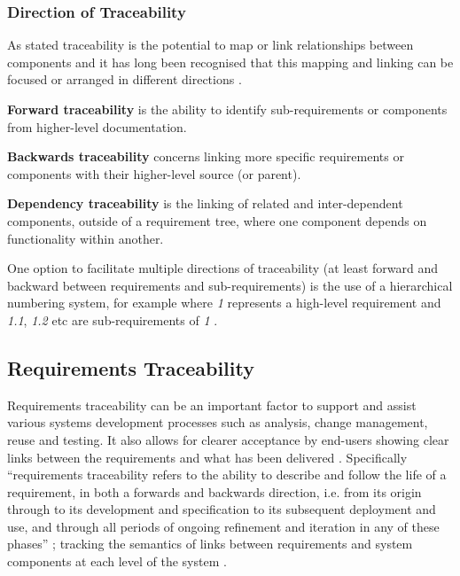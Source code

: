 \subsubsection{Direction of Traceability}\label{lit-traceability-types}

As stated traceability is the potential to map or link relationships between components \citep{asuncion2007end} and it has long been recognised that this mapping and linking can be focused or arranged in different directions \citep{ieee1983srs}.

\textbf{Forward traceability} is the ability to identify sub-requirements or components from higher-level documentation.

\textbf{Backwards traceability} concerns linking more specific requirements or components with their higher-level source (or parent).

\textbf{Dependency traceability} is the linking of related and inter-dependent components, outside of a requirement tree, where one component depends on functionality within another.

\citep{ieee1983srs,gotel1994analysis,asuncion2007end,cleland2012software}

One option to facilitate multiple directions of traceability (at least forward and backward between requirements and sub-requirements) is the use of a hierarchical numbering system, for example where \textit{1} represents a high-level requirement and \textit{1.1}, \textit{1.2} etc are sub-requirements of \textit{1} \citep{ieee1983srs}.

\subsection{Requirements Traceability}\label{lit-traceability-requirements}

Requirements traceability can be an important factor to support and assist various systems development processes such as analysis, change management, reuse and testing. It also allows for clearer acceptance by end-users showing clear links between the requirements and what has been delivered \citep{spanoudakis2005software}. Specifically ``requirements traceability refers to the ability to describe and follow the life of a requirement, in both a forwards and backwards direction, i.e. from its origin through to its development and specification to its subsequent deployment and use, and through all periods of ongoing refinement and iteration in any of these phases'' \citep{gotel1994analysis}; tracking the semantics of links between requirements and system components at each level of the system \citep{harrington1993investigation}.

